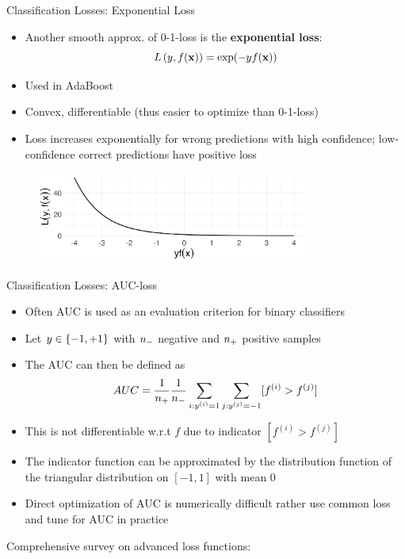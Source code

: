 \documentclass[11pt,compress,t,notes=noshow, xcolor=table]{beamer}
\begin{document}
\begin{vbframe}{Classification Losses: Exponential Loss}


\begin{itemize}
\item Another smooth 
approx. of 0-1-loss is the \textbf{exponential loss}:
$$\Lxy = \exp(-y\fx)$$ 
\item Used in AdaBoost
\item Convex, differentiable (thus easier to optimize than 0-1-loss)
\item Loss increases exponentially for wrong predictions with high confidence; low-confidence correct predictions have positive loss
\end{itemize}


\begin{figure}
\includegraphics[width = 0.8\textwidth]{figure/exponential.png}
\end{figure}

\end{vbframe}

\begin{vbframe}{Classification Losses: AUC-loss}

\begin{itemize}
\item Often AUC is used as an evaluation criterion for binary classifiers
\item Let $y \in \setmp$ with $\nn$ negative and $\np$ positive samples %
\item The AUC can then be defined as
$$AUC = \frac{1}{\np} \frac{1}{\nn} \sum_{i: \yi = 1} \sum_{j: \yi[j] = -1} [f^{(i)} > f^{(j)}]$$
\item This is not differentiable w.r.t $f$ due to indicator $[f^{(i)} > f^{(j)}]$
\item The indicator function can be approximated by the distribution function of the triangular distribution on $[-1, 1]$ with mean $0$
\item Direct optimization of AUC is numerically difficult rather use common loss and tune for AUC in practice

\end{itemize}

Comprehensive survey on advanced loss functions: 

\end{vbframe}





\endlecture
\end{document}
